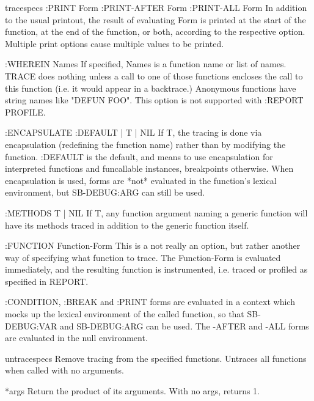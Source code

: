 \documentclass[10pt,english]{book}
\begin{document}
\begin{macro}{trace}{\rest specs}
   :PRINT Form
   :PRINT-AFTER Form
   :PRINT-ALL Form
       In addition to the usual printout, the result of evaluating Form is
       printed at the start of the function, at the end of the function, or
       both, according to the respective option. Multiple print options cause
       multiple values to be printed.

   :WHEREIN Names
       If specified, Names is a function name or list of names. TRACE does
       nothing unless a call to one of those functions encloses the call to
       this function (i.e. it would appear in a backtrace.)  Anonymous
       functions have string names like "DEFUN FOO". This option is not
       supported with :REPORT PROFILE.

   :ENCAPSULATE {:DEFAULT | T | NIL}
       If T, the tracing is done via encapsulation (redefining the function
       name) rather than by modifying the function. :DEFAULT is the default,
       and means to use encapsulation for interpreted functions and funcallable
       instances, breakpoints otherwise. When encapsulation is used, forms are
       *not* evaluated in the function's lexical environment, but SB-DEBUG:ARG
       can still be used.

   :METHODS {T | NIL}
       If T, any function argument naming a generic function will have its
       methods traced in addition to the generic function itself.

   :FUNCTION Function-Form
       This is a not really an option, but rather another way of specifying
       what function to trace. The Function-Form is evaluated immediately,
       and the resulting function is instrumented, i.e. traced or profiled
       as specified in REPORT.

:CONDITION, :BREAK and :PRINT forms are evaluated in a context which
mocks up the lexical environment of the called function, so that
SB-DEBUG:VAR and SB-DEBUG:ARG can be used. The -AFTER and -ALL forms
are evaluated in the null environment.
\end{macro}

\begin{macro}{untrace}{\rest specs}
  Remove tracing from the specified functions. Untraces all
functions when called with no arguments.
\end{macro}

\begin{variable}{*}{\rest args}
  Return the product of its arguments. With no args, returns 1.
\end{variable}
\end{document}
